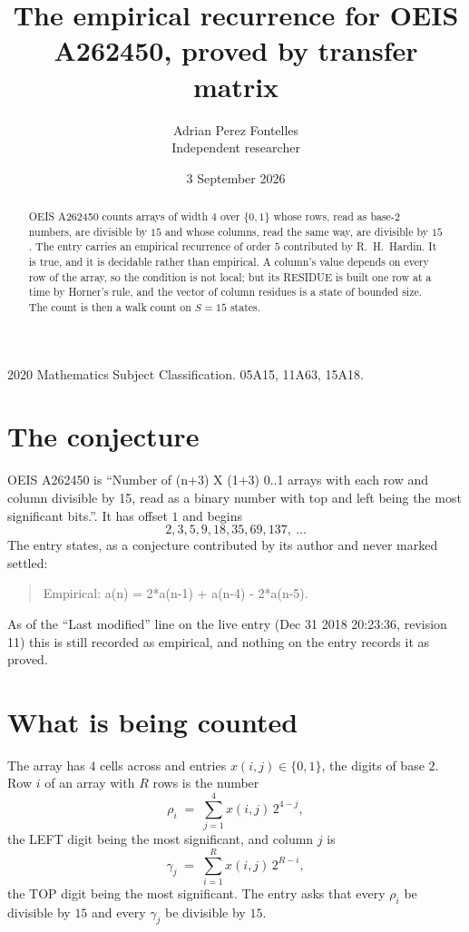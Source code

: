 \documentclass[11pt,a4paper]{article}
\title{The empirical recurrence for OEIS A262450, proved by transfer matrix}
\author{Adrian Perez Fontelles\\ \small Independent researcher}
\date{3 September 2026}
\theoremstyle{plain}
\theoremstyle{definition}
\begin{document}
\maketitle

\begin{abstract}
OEIS A262450 counts arrays of width $4$ over $\{0,1\}$ whose rows, read as base-$2$
numbers, are divisible by $15$ and whose columns, read the same way, are divisible by
$15$. The entry carries an empirical recurrence of order $5$ contributed by
R.~H.~Hardin. It is true, and it is decidable rather than empirical. A column's value depends on
every row of the array, so the condition is not local; but its RESIDUE is built one row at a
time by Horner's rule, and the vector of column residues is a state of bounded size. The count
is then a walk count on $S=15$ states.
\end{abstract}

\noindent\small 2020 Mathematics Subject Classification. 05A15, 11A63, 15A18.\normalsize

\section{The conjecture}

OEIS A262450 is ``Number of (n+3) X (1+3) 0..1 arrays with each row and column divisible by 15, read as a binary number with top and left being the most significant bits.''. It has offset $1$ and begins
\[
2, 3, 5, 9, 18, 35, 69, 137,\ \dots
\]
The entry states, as a conjecture contributed by its author and never marked settled:
\begin{quote}
Empirical: a(n) = 2*a(n-1) + a(n-4) - 2*a(n-5).
\end{quote}
As of the ``Last modified'' line on the live entry (Dec 31 2018 20:23:36, revision 11) this is still
recorded as empirical, and nothing on the entry records it as proved.

\section{What is being counted}

The array has $4$ cells across and entries $x(i,j)\in\{0,1\}$, the digits of
base $2$. Row $i$ of an array with $R$ rows is the number
\[
\rho_i\;=\;\sum_{j=1}^{4}x(i,j)\,2^{4-j} ,
\]
the LEFT digit being the most significant, and column $j$ is
\[
\gamma_j\;=\;\sum_{i=1}^{R}x(i,j)\,2^{R-i} ,
\]
the TOP digit being the most significant. The entry asks that every $\rho_i$ be divisible by
$15$ and every $\gamma_j$ be divisible by $15$.
\end{document}
